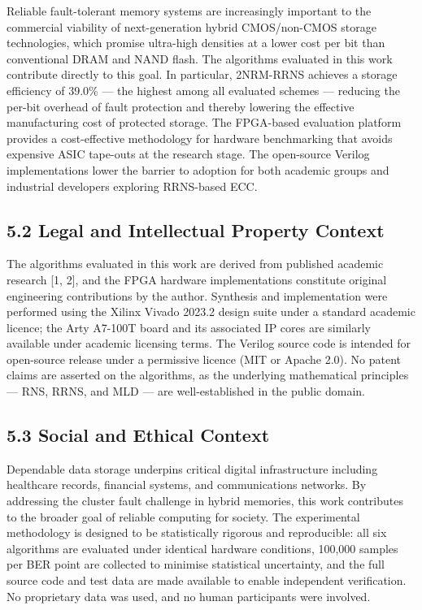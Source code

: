 Reliable fault-tolerant memory systems are increasingly important to the
commercial viability of next-generation hybrid CMOS/non-CMOS storage
technologies, which promise ultra-high densities at a lower cost per bit
than conventional DRAM and NAND flash. The algorithms evaluated in this
work contribute directly to this goal. In particular, 2NRM-RRNS achieves
a storage efficiency of 39.0\% --- the highest among all evaluated
schemes --- reducing the per-bit overhead of fault protection and
thereby lowering the effective manufacturing cost of protected storage.
The FPGA-based evaluation platform provides a cost-effective methodology
for hardware benchmarking that avoids expensive ASIC tape-outs at the
research stage. The open-source Verilog implementations lower the
barrier to adoption for both academic groups and industrial developers
exploring RRNS-based ECC.

\subsection{5.2 Legal and Intellectual Property
Context}\label{legal-and-intellectual-property-context}

The algorithms evaluated in this work are derived from published
academic research {[}1, 2{]}, and the FPGA hardware implementations
constitute original engineering contributions by the author. Synthesis
and implementation were performed using the Xilinx Vivado 2023.2 design
suite under a standard academic licence; the Arty A7-100T board and its
associated IP cores are similarly available under academic licensing
terms. The Verilog source code is intended for open-source release under
a permissive licence (MIT or Apache 2.0). No patent claims are asserted
on the algorithms, as the underlying mathematical principles --- RNS,
RRNS, and MLD --- are well-established in the public domain.

\subsection{5.3 Social and Ethical
Context}\label{social-and-ethical-context}

Dependable data storage underpins critical digital infrastructure
including healthcare records, financial systems, and communications
networks. By addressing the cluster fault challenge in hybrid memories,
this work contributes to the broader goal of reliable computing for
society. The experimental methodology is designed to be statistically
rigorous and reproducible: all six algorithms are evaluated under
identical hardware conditions, 100,000 samples per BER point are
collected to minimise statistical uncertainty, and the full source code
and test data are made available to enable independent verification. No
proprietary data was used, and no human participants were involved.

